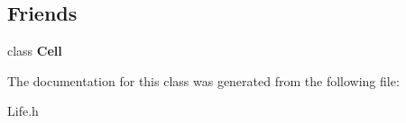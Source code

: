 \subsection*{Friends}
\begin{DoxyCompactItemize}
\item 
\hypertarget{classAbstractCell_a4ceaaf9d661d54f6ed2b18cf0d8830a6}{class {\bfseries Cell}}\label{classAbstractCell_a4ceaaf9d661d54f6ed2b18cf0d8830a6}

\end{DoxyCompactItemize}


The documentation for this class was generated from the following file\-:\begin{DoxyCompactItemize}
\item 
Life.\-h\end{DoxyCompactItemize}

